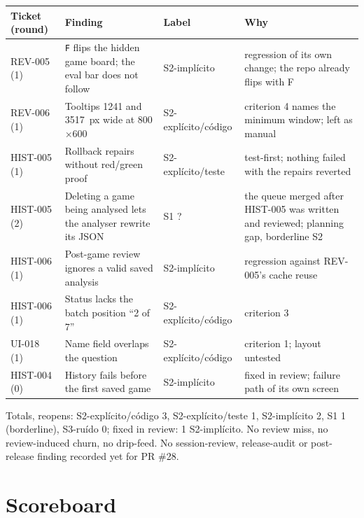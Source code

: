\documentclass[11pt,a4paper]{article}
\begin{document}
{\small\noindent
\begin{tabularx}{\linewidth}{@{}>{\raggedright\arraybackslash}p{1.7cm}X>{\raggedright\arraybackslash}p{2.7cm}X@{}}
\toprule
Ticket (round) & Finding & Label & Why \\
\midrule
REV-005 (1) & \texttt{F} flips the hidden game board; the eval bar does not follow & S2-implícito & regression of its own change; the repo already flips with F \\
REV-006 (1) & Tooltips 1241 and 3517~px wide at 800$\times$600 & S2-explícito/\allowbreak código & criterion 4 names the minimum window; left as manual \\
HIST-005 (1) & Rollback repairs without red/green proof & S2-explícito/\allowbreak teste & test-first; nothing failed with the repairs reverted \\
HIST-005 (2) & Deleting a game being analysed lets the analyser rewrite its JSON & S1 ? & the queue merged after HIST-005 was written and reviewed; planning gap, borderline S2 \\
HIST-006 (1) & Post-game review ignores a valid saved analysis & S2-implícito & regression against REV-005's cache reuse \\
HIST-006 (1) & Status lacks the batch position ``2 of 7'' & S2-explícito/\allowbreak código & criterion 3 \\
UI-018 (1) & Name field overlaps the question & S2-explícito/\allowbreak código & criterion 1; layout untested \\
HIST-004 (0) & History fails before the first saved game & S2-implícito & fixed in review; failure path of its own screen \\
\bottomrule
\end{tabularx}
}

Totals, reopens: S2-explícito/código 3, S2-explícito/teste 1, S2-implícito 2, S1 1 (borderline),
S3-ruído 0; fixed in review: 1 S2-implícito. No review miss, no review-induced churn, no
drip-feed. No session-review, release-audit or post-release finding recorded yet for PR \#28.

\section*{Scoreboard}
\end{document}
